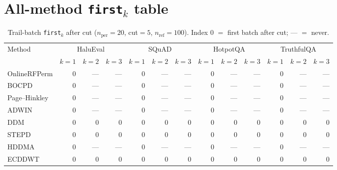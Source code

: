 \documentclass[11pt]{article}
\begin{document}
\section{All-method \texttt{first}$_k$ table}
\begin{table}[h]
\centering
\small
\caption{Trail-batch \texttt{first}$_k$ after cut
($n_{\mathrm{per}}=20$, cut$=5$, $n_{\mathrm{ref}}=100$).
Index $0$ $=$ first batch after cut; --- $=$ never.}
\begin{tabular}{lrrrrrrrrrrrr}
\toprule
Method & \multicolumn{3}{c}{HaluEval} & \multicolumn{3}{c}{SQuAD}
 & \multicolumn{3}{c}{HotpotQA} & \multicolumn{3}{c}{TruthfulQA} \\
\cmidrule(lr){2-4} \cmidrule(lr){5-7} \cmidrule(lr){8-10} \cmidrule(lr){11-13}
 & $k{=}1$ & $k{=}2$ & $k{=}3$ & $k{=}1$ & $k{=}2$ & $k{=}3$
 & $k{=}1$ & $k{=}2$ & $k{=}3$ & $k{=}1$ & $k{=}2$ & $k{=}3$ \\
\midrule
OnlineRFPerm & 0 & --- & --- & 0 & --- & --- & 0 & --- & --- & 0 & --- & --- \\
BOCPD        & 0 & --- & --- & 0 & --- & --- & 0 & --- & --- & 0 & --- & --- \\
Page--Hinkley& 0 & --- & --- & 0 & --- & --- & 0 & --- & --- & 0 & --- & --- \\
ADWIN        & 0 & --- & --- & 0 & --- & --- & 0 & --- & --- & 0 & --- & --- \\
DDM          & 0 & 0   & 0   & 0 & 0   & 0   & 0 & 0   & 0   & 0 & 0   & 0   \\
STEPD        & 0 & 0   & 0   & 0 & 0   & 0   & 0 & 0   & 0   & 0 & 0   & 0   \\
HDDMA        & 0 & --- & --- & 0 & --- & --- & 0 & --- & --- & 0 & --- & --- \\
ECDDWT       & 0 & 0   & 0   & 0 & 0   & 0   & 0 & 0   & 0   & 0 & 0   & 0   \\
\bottomrule
\end{tabular}
\end{table}
\end{document}
